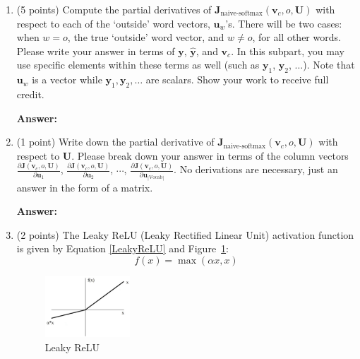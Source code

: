 \documentclass{article}
\newenvironment{answer}{
    {\bf Answer:} \sf \begingroup\color{red}
}{\endgroup}%
\begin{document}
\begin{enumerate}[label=(\alph*)]
\begin{shaded}
\begin{answer}

\end{answer}
\end{shaded}

\item (5 points) Compute the partial derivatives of $\bm J_{\text{naive-softmax}}(\bm v_c, o, \bm U)$ with respect to each of the `outside' word vectors, $\bm u_w$'s. There will be two cases: when $w=o$, the true `outside' word vector, and $w \neq o$, for all other words. Please write your answer in terms of $\bm y$, $\hat{\bm y}$, and $\bm v_c$. In this subpart, you may use specific elements within these terms as well (such as $\bm y_1$, $\bm y_2$, $\dots$). Note that $\bm u_w$ is a vector while $\bm y_1, \bm y_2, \dots$ are scalars. Show your work to receive full credit.

\begin{shaded}
\begin{answer}

\end{answer}
\end{shaded}

\item (1 point) Write down the partial derivative of $\bm J_{\text{naive-softmax}}(\bm v_c, o, \bm U)$ with respect to $\bm U$. Please break down your answer in terms of the column vectors $\frac{\partial \bm J(\bm v_c, o, \bm U)}{\partial \bm u_1}$, $\frac{\partial \bm J(\bm v_c, o, \bm U)}{\partial \bm u_2}$, $\cdots$, $\frac{\partial \bm J(\bm v_c, o, \bm U)}{\partial \bm u_{|\text{Vocab}|}}$. No derivations are necessary, just an answer in the form of a matrix.

\begin{shaded}
\begin{answer}

\end{answer}
\end{shaded}

\item (2 points) The Leaky ReLU (Leaky Rectified Linear Unit) activation function is given by Equation \ref{LeakyReLU} and Figure~\ref{fig:leaky_relu}:
\begin{equation}
    \label{LeakyReLU}
    f(x) = \max(\alpha x, x)
\end{equation}

\begin{figure}[h]
    \centering
    \includegraphics[width=0.3\textwidth]{leaky_relu_graph.png}
    \caption{Leaky ReLU}
    \label{fig:leaky_relu}
\end{figure}


\end{enumerate}
\end{document}
